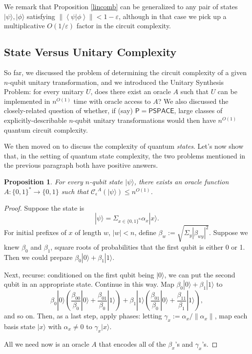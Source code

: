\documentclass[12pt]{report}
\theoremstyle{plain}
\newtheorem{proposition}[theorem]{Proposition}
\theoremstyle{definition}
\newcommand{\eps}{\varepsilon}
\renewcommand{\ket}[1]{|#1\rangle}
\newcommand{\sizee}{\ensuremath{\mathcal{C}_\epsilon}}
\begin{document}
We remark that Proposition \ref{lincomb} can be generalized to any pair of states $\ket{\psi},\ket{\phi}$ satisfying $\left\|\left\langle \psi | \phi \right\rangle \right\| < 1-\eps$, although in that case we pick up a multiplicative $O(1/\eps)$ factor in the circuit complexity.

\subsection{State Versus Unitary Complexity}

So far, we discussed the problem of determining the circuit complexity of a given $n$-qubit unitary transformation, and we introduced the Unitary Synthesis Problem: for every unitary $U$, does there exist an oracle $A$ such that $U$ can be implemented in $n^{O(1)}$ time with oracle access to $A$?  We also discussed the closely-related question of whether, if (say) $\mathsf{P}=\mathsf{PSPACE}$, large classes of explicitly-describable $n$-qubit unitary transformations would then have $n^{O(1)}$ quantum circuit complexity.

We then moved on to discuss the complexity of quantum {\em states}.  Let's now show that, in the setting of quantum state complexity, the two problems mentioned in the previous paragraph both have positive answers.

\begin{proposition}
\label{canmake}
For every $n$-qubit state $\ket{\psi}$, there exists an oracle function $A:\{0,1\}^*\longrightarrow \{0,1\}$ such that $\sizee^A(\ket{\psi}) \leq n^{O(1)}$.
\end{proposition}
 \begin{proof}
 Suppose the state is
 $$\ket{\psi} = \Sigma_{x \in \{0,1\}^n} \alpha_x \ket{x}.$$
 For initial prefixes of $x$ of length $w$,  $|w| <n$, define $\beta_w:= \sqrt{\Sigma_{y} |\beta_{w y }|^2}$.
Suppose we knew $\beta_0$  and $\beta_1$, square roots of probabilities that the first qubit is either 0 or 1. Then we could prepare  $\beta_0 \ket{0} + \beta_1 \ket{1}$.

  Next, recurse: conditioned on the first qubit being $\ket{0}$, we can put the second qubit in an appropriate state. Continue in this way.  Map $\beta_0 \ket{0}+\beta_1\ket{1}$ to
 \[
 \beta_0 \ket{0} \left(\frac{\beta_{00}}{\beta_0} \ket{0} + \frac{\beta_{01}}{\beta_0} \ket{1}\right)+ \beta_1 \ket{1} \left(\frac{\beta_{01}}{\beta_0} \ket{0} + \frac{\beta_{11}}{\beta_1} \ket{1}\right),
 \]
and so on.  Then, as a last step, apply phases: letting $\gamma_x := \alpha_x / \| \alpha_x \|$, map each basis state $\ket{x}$ with $\alpha_x \neq 0$ to $\gamma_x \ket{x}$.

 All we need now is an oracle $A$ that encodes all of the $\beta_x$'s and $\gamma_x$'s.
  \end{proof}
\end{document}
